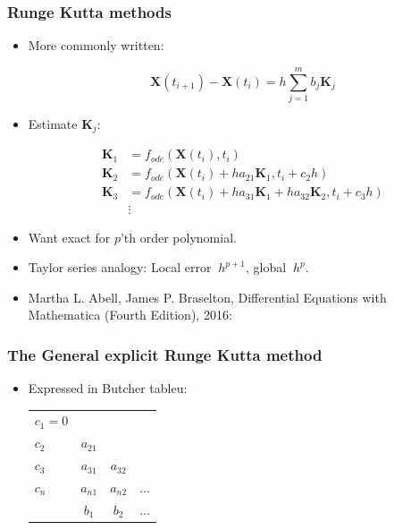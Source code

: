 \documentclass{beamer}
\begin{document}
\begin{frame}
\frametitle{Runge Kutta methods}
\begin{itemize}

\item<1-> More commonly written:

\begin{equation*}
\mathbf{X}(t_{i+1})-\mathbf{X}(t_{i}) =  h \sum_{j=1}^{m} b_j \mathbf{K}_j
\end{equation*}

\item<2-> Estimate $\mathbf{K}_j$:

\begin{align*}
\mathbf{K}_1 &= f_{ode}(\mathbf{X}(t_i),t_i)\\
\mathbf{K}_2 &= f_{ode}(\mathbf{X}(t_i)+ha_{21} \mathbf{K}_1,t_i+c_2 h)\\
\mathbf{K}_3 &= f_{ode}(\mathbf{X}(t_i)+ha_{31} \mathbf{K}_1+ha_{32} \mathbf{K}_2,t_i+c_3 h)\\
&\vdots
\end{align*}

\item<3-> Want exact for $p$'th order polynomial.

\item<4-> Taylor series analogy: Local error  $~h^{p+1}$, global $~h^{p}$.

\item<1-> {{\color{gray} Martha L. Abell, James P. Braselton, Differential Equations with Mathematica (Fourth Edition), 2016}}:
\end{itemize}
\end{frame}


\begin{frame}
\frametitle{The General explicit Runge Kutta method}
\begin{itemize}


\item<1-> Expressed in Butcher tableu:

\begin{tabular}{l | @{\quad} c @{\quad} c @{\quad} c}
$c_1=0$ \\
$c_2$ & $a_{21}$\\
$c_3$ & $a_{31}$ &  $a_{32}$\\
$c_n$ & $a_{n1}$ &  $a_{n2}$ & $\hdots$\\
\midrule
& $b_1$ & $b_2$ & $\hdots$
\end{tabular}
\end{itemize}
\end{frame}
\end{document}
